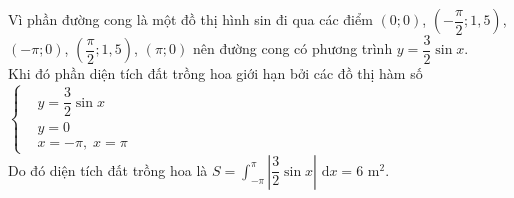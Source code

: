 \begin{ex}
{		Vì phần đường cong là một đồ thị hình  sin đi qua các điểm $(0;0)$, $\left(-\dfrac{\pi}{2}; 1{,}5 \right)$, $(-\pi;0)$, $\left(\dfrac{\pi}{2}; 1{,}5 \right)$, $(\pi; 0)$ nên đường cong có phương trình $y = \dfrac{3}{2} \sin x$.\\
		Khi đó phần diện tích đất trồng hoa giới hạn bởi các đồ thị hàm  số
		$ \left\{ 
		\begin{aligned}
			&y = \dfrac{3}{2} \sin  x \\
			&y = 0  \\
			&x  = -\pi,\; x = \pi
		\end{aligned}
		 \right.$\\
		 Do đó diện tích đất trồng hoa là
		$ 
		S = \displaystyle\int_{-\pi}^{\pi} \left| \dfrac{3}{2} \sin x \right| \, \mathrm{\,d}x = 6 \text{ m}^2. 
		$ 
		 }
\end{ex}

